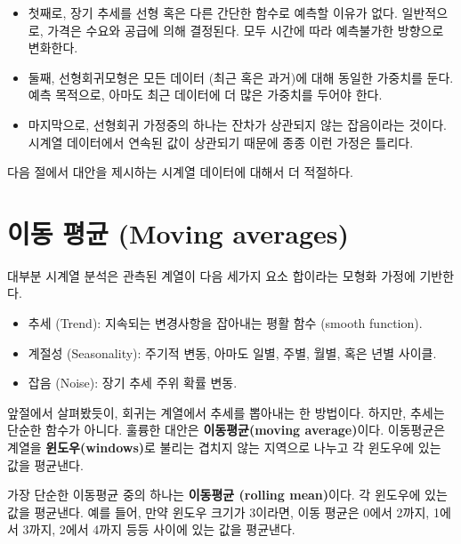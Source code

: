 \begin{itemize}

\item 첫째로, 장기 추세를 선형 혹은 다른 간단한 함수로 예측할 이유가 없다.
일반적으로, 가격은 수요와 공급에 의해 결정된다. 모두 시간에 따라 예측불가한 방향으로 변화한다.

\item 둘째, 선형회귀모형은 모든 데이터 (최근 혹은 과거)에 대해 동일한 가중치를 둔다. 예측 목적으로, 아마도 최근 데이터에 더 많은 가중치를 두어야 한다.

\item 마지막으로, 선형회귀 가정중의 하나는 잔차가 상관되지 않는 잡음이라는 것이다. 시계열 데이터에서 연속된 값이 상관되기 때문에 종종 이런 가정은 틀리다. 

\end{itemize}

다음 절에서 대안을 제시하는 시계열 데이터에 대해서 더 적절하다.

\section{이동 평균 (Moving averages)}

대부분 시계열 분석은 관측된 계열이 다음 세가지 요소 합이라는 모형화 가정에 기반한다.


\begin{itemize}

\item 추세 (Trend): 지속되는 변경사항을 잡아내는 평활 함수 (smooth function).

\item 계절성 (Seasonality): 주기적 변동, 아마도 일별, 주별, 월별, 혹은 년별 사이클.

\item 잡음 (Noise): 장기 추세 주위 확률 변동.

\end{itemize}

앞절에서 살펴봤듯이, 회귀는 계열에서 추세를 뽑아내는 한 방법이다. 하지만, 추세는 단순한 함수가 아니다. 훌륭한 대안은 {\bf 이동평균(moving average)}이다. 이동평균은 계열을 {\bf 윈도우(windows)}로 불리는 겹치지 않는 지역으로 나누고 각 윈도우에 있는 값을 평균낸다.

가장 단순한 이동평균 중의 하나는 {\bf 이동평균 (rolling mean)}이다. 각 윈도우에 있는 값을 평균낸다. 예를 들어, 만약 윈도우 크기가 3이라면, 이동 평균은 0에서 2까지, 1에서 3까지, 2에서 4까지 등등 사이에 있는 값을 평균낸다.

